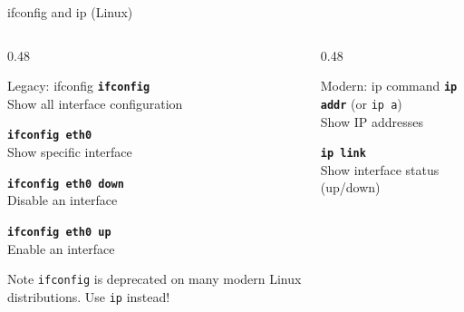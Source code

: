 \documentclass[aspectratio=169]{beamer}  %
\begin{document}
\begin{frame}{ifconfig and ip (Linux)}
    \begin{columns}[T]
        \begin{column}{0.48\textwidth}
            \begin{block}{Legacy: ifconfig}
                \small
                \texttt{\textbf{ifconfig}} \\
                Show all interface configuration
                
                \vspace{0.3em}
                \texttt{\textbf{ifconfig eth0}} \\
                Show specific interface
                
                \vspace{0.3em}
                \texttt{\textbf{ifconfig eth0 down}} \\
                Disable an interface
                
                \vspace{0.3em}
                \texttt{\textbf{ifconfig eth0 up}} \\
                Enable an interface
            \end{block}
            
            \vspace{0.2em}
            \begin{alertblock}{Note}
                \small
                \texttt{ifconfig} is deprecated on many modern Linux distributions. Use \texttt{ip} instead!
            \end{alertblock}
        \end{column}
        \begin{column}{0.48\textwidth}
            \begin{block}{Modern: ip command}
                \small
                \texttt{\textbf{ip addr}} (or \texttt{ip a}) \\
                Show IP addresses
                
                \vspace{0.3em}
                \texttt{\textbf{ip link}} \\
                Show interface status (up/down)
                

\end{block}
\end{column}
\end{columns}
\end{frame}
\end{document}
